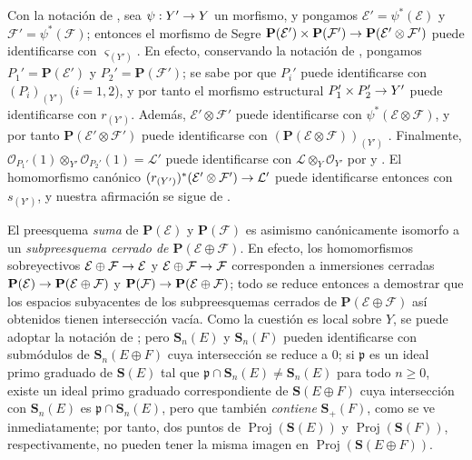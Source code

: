 \documentclass[oneside,10pt]{amsart}
\makeatletter
\renewcommand{\geq}{\geqslant}
\newcommand{\ega@arrow}[2]{\mathchoice{#1}{#2}{#2}{#2}}
\renewcommand{\to}{\ega@arrow{\longrightarrow}{\rightarrow}}
\let\EGAOriginalLabel\label
\renewcommand{\label}[1]{\phantomsection\EGAOriginalLabel{#1}}
\makeatother
\begin{document}
\begin{env}[4.3.5]
\label{II.4.3.5-fr}
Con la notación de , sea $\psi:Y'\to Y$ un morfismo, y pongamos $\mathcal{E}'=\psi^*(\mathcal{E})$ y $\mathcal{F}'=\psi^*(\mathcal{F})$;
entonces el morfismo de Segre $\mathbf{P}(\mathcal{E}')\times\mathbf{P}(\mathcal{F}')
\to\mathbf{P}(\mathcal{E}'\otimes\mathcal{F}')$ puede identificarse con $\varsigma_{(Y')}$.
En efecto, conservando la notación de , pongamos $P_1'=\mathbf{P}(\mathcal{E}')$ y $P_2'=\mathbf{P}(\mathcal{F}')$;
se sabe por  que $P_i'$ puede identificarse con $(P_i)_{(Y')}$ ($i=1,2$), y por tanto el morfismo estructural $P_1'\times P_2'\to Y'$ puede identificarse con $r_{(Y')}$.
Además, $\mathcal{E}'\otimes\mathcal{F}'$ puede identificarse con $\psi^*(\mathcal{E}\otimes\mathcal{F})$, y por tanto $\mathbf{P}(\mathcal{E}'\otimes\mathcal{F}')$ puede identificarse con $(\mathbf{P}(\mathcal{E}\otimes\mathcal{F}))_{(Y')}$ .
Finalmente, $\mathcal{O}_{P_1'}(1)\otimes_{Y'}\mathcal{O}_{P_2'}(1)=\mathcal{L}'$ puede identificarse con $\mathcal{L}\otimes_Y\mathcal{O}_{Y'}$ por  y .
El homomorfismo canónico $(r_{(Y')})^*(\mathcal{E}'\otimes\mathcal{F}')\to\mathcal{L}'$ puede identificarse entonces con $s_{(Y')}$, y nuestra afirmación se sigue de .
\end{env}

\begin{remark}[4.3.6]
\label{II.4.3.6-fr}
El preesquema \emph{suma} de $\mathbf{P}(\mathcal{E})$ y $\mathbf{P}(\mathcal{F})$ es asimismo canónicamente isomorfo a un \emph{subpreesquema cerrado de $\mathbf{P}(\mathcal{E}\oplus\mathcal{F})$}.
En efecto, los homomorfismos sobreyectivos $\mathcal{E}\oplus\mathcal{F}\to\mathcal{E}$ y $\mathcal{E}\oplus\mathcal{F}\to\mathcal{F}$ corresponden a inmersiones cerradas $\mathbf{P}(\mathcal{E})\to\mathbf{P}(\mathcal{E}\oplus\mathcal{F})$ y $\mathbf{P}(\mathcal{F})\to\mathbf{P}(\mathcal{E}\oplus\mathcal{F})$;
todo se reduce entonces a demostrar que los espacios subyacentes de los subpreesquemas cerrados de $\mathbf{P}(\mathcal{E}\oplus\mathcal{F})$ así obtenidos tienen intersección vacía.
Como la cuestión es local sobre $Y$, se puede adoptar la notación de ;
pero $\mathbf{S}_n(E)$ y $\mathbf{S}_n(F)$ pueden identificarse con submódulos de $\mathbf{S}_n(E\oplus F)$ cuya intersección se reduce a $0$;
si $\mathfrak{p}$ es un ideal primo graduado de $\mathbf{S}(E)$ tal que $\mathfrak{p}\cap\mathbf{S}_n(E)\neq\mathbf{S}_n(E)$ para todo $n\geq0$, existe un ideal primo graduado correspondiente de $\mathbf{S}(E\oplus F)$ cuya intersección con $\mathbf{S}_n(E)$ es $\mathfrak{p}\cap\mathbf{S}_n(E)$, pero que también \emph{contiene} $\mathbf{S}_+(F)$, como se ve inmediatamente;
por tanto, dos puntos de $\operatorname{Proj}(\mathbf{S}(E))$ y $\operatorname{Proj}(\mathbf{S}(F))$, respectivamente, no pueden tener la misma imagen en $\operatorname{Proj}(\mathbf{S}(E\oplus F))$.
\end{remark}
\end{document}
